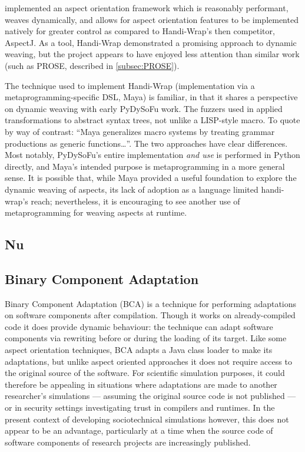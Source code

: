 \citeauthor{Baker_2002} implemented an aspect orientation framework which is
reasonably performant, weaves dynamically, and allows for aspect orientation
features to be implemented natively for greater control as compared to
Handi-Wrap's then competitor, AspectJ. As a tool, Handi-Wrap demonstrated a
promising approach to dynamic weaving, but the project appears to have enjoyed
less attention than similar work (such as PROSE, described in
\cref{subsec:PROSE}).

The technique used to implement Handi-Wrap (implementation via a
metaprogramming-specific DSL, Maya) is familiar, in that it shares a perspective
on dynamic weaving with early PyDySoFu work. The fuzzers used in
\cite{wallis2018caise} applied transformations to abstract syntax trees, not
unlike a LISP-style macro. To quote \cite{baker2002maya} by way of contrast:
``{\ttfamily{}Maya generalizes macro systems by treating grammar productions as
generic functions\ldots{}}''. The two
approaches have clear differences. Most notably, PyDySoFu's entire
implementation \emph{and use} is performed in Python directly, and Maya's
intended purpose is metaprogramming in a more general sense. It is possible
that, while Maya provided a useful foundation to explore the dynamic weaving of
aspects, its lack of adoption as a language limited handi-wrap's reach;
nevertheless, it is encouraging to see another use of metaprogramming for
weaving aspects at runtime.

\subsection{Nu}

\subsection{Binary Component Adaptation}\label{subsec:BCA} Binary Component
Adaptation\cite{keller1998binary} (BCA) is a technique for performing
adaptations on software components after compilation. Though it works on
already-compiled code it does provide dynamic behaviour: the technique can adapt
software components via rewriting before or during the loading of its target.
Like some aspect orientation techniques, BCA adapts a Java class
loader to make its adaptations, but unlike aspect oriented approaches it does
not require access to the original source of the software. For scientific
simulation purposes, it could therefore be appealing in situations where
adaptations are made to another researcher's simulations --- assuming the
original source code is not published --- or in security settings investigating
trust in compilers and runtimes\cite{trustingtrust}. In the present context of
developing sociotechnical simulations however, this does not appear to be an
advantage, particularly at a time when the source code of software components of
research projects are increasingly published.

